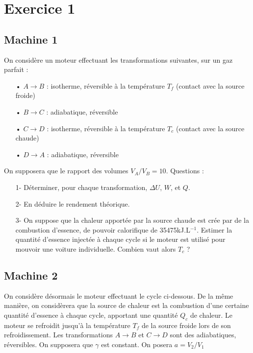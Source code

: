 \documentclass{report}
\begin{document}
\section*{Exercice 1}

\subsection*{Machine 1}

On considère un moteur effectuant les transformations suivantes, sur un gaz parfait : 

\begin{itemize}
\item[•]$A \rightarrow B$ : isotherme, réversible à la température $T_f$ (contact avec la source froide)
\item[•]$B \rightarrow C$ : adiabatique, réversible
\item[•]$C \rightarrow D$ : isotherme, réversible à la température $T_c$ (contact avec la source chaude)
\item[•]$D \rightarrow A$ : adiabatique, réversible

\end{itemize}

On supposera que le rapport des volumes $V_A/V_B=10$. Questions : 

\begin{itemize}
\item[1-] Déterminer, pour chaque transformation, $\Delta U$, $W$, et $Q$. 
\item[2-] En déduire le rendement théorique.
\item[3-] On suppose que la chaleur apportée par la source chaude est crée par de la combustion d'essence, de pouvoir calorifique de 35475kJ.L$^{-1}$. Estimer la quantité d'essence injectée à chaque cycle si le moteur est utilisé pour mouvoir une voiture individuelle. Combien vaut alors $T_c$ ?
\end{itemize}

\subsection*{Machine 2}

On considère désormais le moteur effectuant le cycle ci-dessous. De la même manière, on considèrera que la source de chaleur est la combustion d'une certaine quantité d'essence à chaque cycle, apportant une quantité $Q_c$ de chaleur. Le moteur se refroidit jusqu'à la température $T_f$ de la source froide lors de son refroidissement. Les transformations $A\rightarrow B$ et $C\rightarrow D$ sont des adiabatiques, réversibles. On supposera que $\gamma$ est constant. On posera $a=V_2/V_1$
\end{document}
